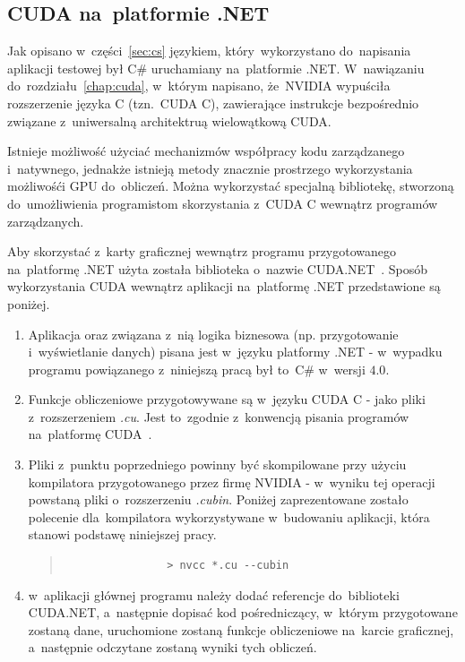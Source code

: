 \subsection{CUDA na~platformie .NET}
Jak opisano w~części~\ref{sec:cs} językiem, który~wykorzystano do~napisania aplikacji testowej był C\# uruchamiany na~platformie .NET. W~nawiązaniu do~rozdziału~\ref{chap:cuda}, w~którym napisano, że~NVIDIA wypuściła rozszerzenie języka C (tzn.~CUDA C), zawierające instrukcje bezpośrednio związane z~uniwersalną architektruą wielowątkową CUDA.

Istnieje możliwość użyciać mechanizmów współpracy kodu zarządzanego i~natywnego, jednakże istnieją metody znacznie prostrzego wykorzystania możliwośći GPU do~obliczeń. Można wykorzystać specjalną bibliotekę, stworzoną do~umożliwienia programistom skorzystania z~CUDA C wewnątrz programów zarządzanych.

Aby skorzystać z~karty graficznej wewnątrz programu przygotowanego na~platformę .NET użyta została biblioteka o~nazwie CUDA.NET~\cite{cuda:net}. Sposób wykorzystania CUDA wewnątrz aplikacji na~platformę .NET przedstawione są poniżej.

\begin{enumerate}
	\item Aplikacja oraz związana z~nią logika biznesowa (np. przygotowanie i~wyświetlanie danych) pisana jest w~języku platformy .NET - w~wypadku programu powiązanego z~niniejszą pracą był to~C\# w~wersji $4.0$.
	\item Funkcje obliczeniowe przygotowywane są w~języku CUDA C - jako pliki z~rozszerzeniem \emph{.cu}. Jest to~zgodnie z~konwencją pisania programów na~platformę CUDA~\cite{Cuda:PGuide}.
	\item Pliki z~punktu poprzedniego powinny być skompilowane przy użyciu kompilatora przygotowanego przez firmę NVIDIA - w~wyniku tej operacji powstaną pliki o~rozszerzeniu \emph{.cubin}. Poniżej zaprezentowane zostało polecenie dla~kompilatora wykorzystywane w~budowaniu aplikacji, która stanowi podstawę niniejszej pracy.
		\begin{quote}
			\begin{verbatim}
				> nvcc *.cu --cubin
			\end{verbatim}
		\end{quote}
	\item w~aplikacji głównej programu należy dodać referencje do~biblioteki CUDA.NET, a~następnie dopisać kod pośredniczący, w~którym przygotowane zostaną dane, uruchomione zostaną funkcje obliczeniowe na~karcie graficznej, a~następnie odczytane zostaną wyniki tych obliczeń.
\end{enumerate}

